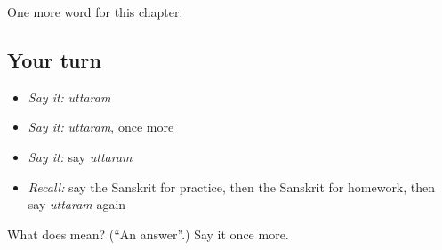 \begin{grammarlens}[title={What you've built}]
One more word for this chapter.
\end{grammarlens}

\subsection*{Your turn}
\begin{itemize}
\raggedright
  \item \emph{Say it:} \emph{uttaram}
  \item \emph{Say it:} \emph{uttaram}, once more
  \item \emph{Say it:} say \emph{uttaram}
  \item \emph{Recall:} say the Sanskrit for practice, then the Sanskrit for homework, then say \emph{uttaram} again
\end{itemize}

\begin{tcolorbox}[breakable,colback=teal!4,colframe=teal!35!black,title={Before you move on}]
What does  mean? (\textquotedblleft{}An answer\textquotedblright{}.) Say it once more.
\end{tcolorbox}
